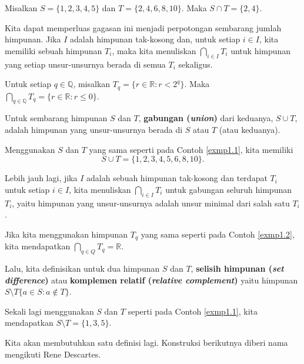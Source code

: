 \begin{exmp}
\label{exmp1.1}
Misalkan $S = \{1, 2, 3, 4, 5\}$ dan $T = \{2, 4, 6, 8, 10\}$. Maka $S \cap T = \{2, 4\}$.
\end{exmp}

Kita dapat memperluas gagasan ini menjadi perpotongan sembarang jumlah himpunan. Jika $I$ adalah himpunan tak-kosong dan, untuk setiap $i \in I$, kita memiliki sebuah himpunan $T_i$, maka kita menuliskan $\bigcap_{i\in I} T_i$ untuk himpunan yang setiap unsur-unsurnya berada di semua $T_i$ sekaligus.

\begin{exmp}
\label{exmp1.2}
Untuk setiap $q \in \mathbb{Q}$, misalkan $T_q = \{r \in \mathbb{R} : r < 2^q \}$. Maka $\bigcap_{q\in \mathbb{Q}} T_q = \{r \in \mathbb{R} : r \leq 0\}$.
\end{exmp}

Untuk sembarang himpunan $S$ dan $T$, \textbf{gabungan (\textit{union})} dari keduanya, $S \cup T$, adalah himpunan yang unsur-unsurnya berada di $S$ atau $T$ (atau keduanya).

\begin{exmp}
Menggunakan $S$ dan $T$ yang sama seperti pada Contoh \ref{exmp1.1}, kita memiliki \[ S \cup T = \{1, 2, 3, 4, 5, 6, 8, 10\}. \]
\end{exmp}

Lebih jauh lagi, jika $I$ adalah sebuah himpunan tak-kosong dan terdapat $T_i$ untuk setiap $i \in I$, kita menuliskan $\bigcap_{i \in I} T_i$ untuk gabungan seluruh himpunan $T_i$, yaitu himpunan yang unsur-unsurnya adalah unsur minimal dari salah satu $T_i$.

\begin{exmp}
Jika kita menggunakan himpunan $T_q$ yang sama seperti pada Contoh \ref{exmp1.2}, kita mendapatkan $\bigcap_{q \in Q} T_q = \mathbb{R}$.
\end{exmp}

Lalu, kita definisikan untuk dua himpunan $S$ dan $T$, \textbf{selisih himpunan (\textit{set difference})} atau \textbf{komplemen relatif (\textit{relative complement})} yaitu himpunan $S \setminus T \{a \in S : a \notin T\}$.

\begin{exmp}
Sekali lagi menggunakan $S$ dan $T$ seperti pada Contoh \ref{exmp1.1}, kita mendapatkan $S \setminus T = \{1, 3, 5\}$.
\end{exmp}

Kita akan membutuhkan satu definisi lagi. Konstruksi berikutnya diberi nama mengikuti Rene Descartes.

